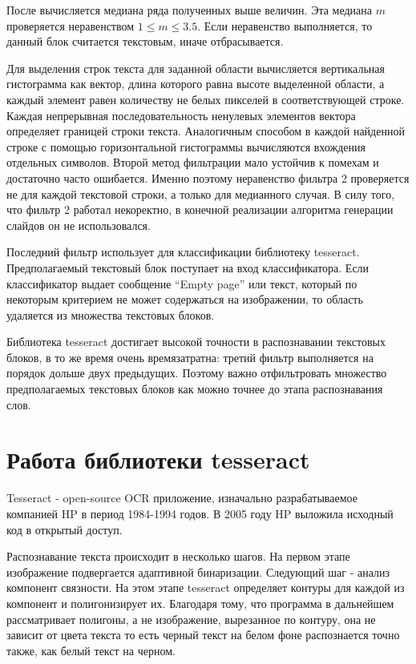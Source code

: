 \documentclass[oneside,final,14pt]{extreport}
\begin{document}
После вычисляется медиана ряда полученных выше величин. Эта медиана $m$ проверяется неравенством
$1 \leq m \leq 3.5$. Если неравенство выполняется, то данный блок считается текстовым, иначе отбрасывается. 

 Для выделения строк текста для заданной области вычисляется вертикальная гистограмма как вектор, длина которого равна высоте выделенной области, а каждый элемент равен количеству не белых пикселей в соответствующей строке. Каждая непрерывная последовательность ненулевых элементов вектора определяет границей строки текста. Аналогичным способом в каждой найденной строке с помощью горизонтальной гистограммы вычисляются вхождения отдельных символов. Второй метод фильтрации мало устойчив к помехам и достаточно часто ошибается. Именно поэтому неравенство фильтра 2 проверяется не для каждой текстовой строки, а только для медианного случая. В силу того, что фильтр 2 работал некоректно, в конечной реализации алгоритма генерации слайдов он не использовался.

Последний фильтр использует для классификации библиотеку tesseract. Предполагаемый текстовый блок поступает на вход классификатора.  Если классификатор выдает сообщение “Empty page” или текст, который по некоторым критерием не может содержаться на изображении, то область удаляется из множества текстовых блоков. 

Библиотека tesseract достигает высокой точности в распознавании текстовых блоков, в то же время очень времязатратна: третий фильтр выполняется на порядок дольше двух предыдущих. Поэтому важно отфильтровать множество предполагаемых текстовых блоков как можно точнее до этапа распознавания слов.

\section{Работа библиотеки tesseract}

Tesseract - open-source OCR приложение, изначально разрабатываемое компанией HP в период 1984-1994 годов. В 2005 году HP выложила исходный код  в открытый доступ\cite{Smith:Tesseract}. 

Распознавание текста происходит в несколько шагов. На первом этапе изображение подвергается адаптивной бинаризации. Следующий шаг - анализ компонент связности. На этом этапе tesseract определяет контуры для каждой из компонент и полигонизирует их. Благодаря тому, что программа в дальнейшем рассматривает полигоны, а не изображение, вырезанное по контуру, она не зависит от цвета текста то есть черный текст на белом фоне распознается точно также, как белый текст на черном. 
\end{document}
